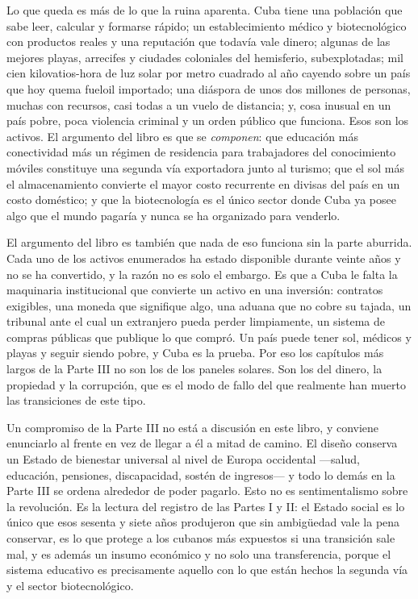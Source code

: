 Lo que queda es más de lo que la ruina aparenta. Cuba tiene una población que
sabe leer, calcular y formarse rápido; un establecimiento médico y
biotecnológico con productos reales y una reputación que todavía vale dinero;
algunas de las mejores playas, arrecifes y ciudades coloniales del hemisferio,
subexplotadas; mil cien kilovatios-hora de luz solar por metro cuadrado al año
cayendo sobre un país que hoy quema fueloil importado; una diáspora de unos dos
millones de personas, muchas con recursos, casi todas a un vuelo de distancia;
y, cosa inusual en un país pobre, poca violencia criminal y un orden público que
funciona. Esos son los activos. El argumento del libro es que se
\emph{componen}: que educación más conectividad más un régimen de residencia
para trabajadores del conocimiento móviles constituye una segunda vía
exportadora junto al turismo; que el sol más el almacenamiento convierte el
mayor costo recurrente en divisas del país en un costo doméstico; y que la
biotecnología es el único sector donde Cuba ya posee algo que el mundo pagaría y
nunca se ha organizado para venderlo.

El argumento del libro es también que nada de eso funciona sin la parte
aburrida. Cada uno de los activos enumerados ha estado disponible durante veinte
años y no se ha convertido, y la razón no es solo el embargo. Es que a Cuba le
falta la maquinaria institucional que convierte un activo en una inversión:
contratos exigibles, una moneda que signifique algo, una aduana que no cobre su
tajada, un tribunal ante el cual un extranjero pueda perder limpiamente, un
sistema de compras públicas que publique lo que compró. Un país puede tener sol,
médicos y playas y seguir siendo pobre, y Cuba es la prueba. Por eso los
capítulos más largos de la Parte III no son los de los paneles solares. Son los
del dinero, la propiedad y la corrupción, que es el modo de fallo del que
realmente han muerto las transiciones de este tipo.

Un compromiso de la Parte III no está a discusión en este libro, y conviene
enunciarlo al frente en vez de llegar a él a mitad de camino. El diseño conserva
un Estado de bienestar universal al nivel de Europa occidental ---salud,
educación, pensiones, discapacidad, sostén de ingresos--- y todo lo demás en la
Parte III se ordena alrededor de poder pagarlo. Esto no es sentimentalismo sobre
la revolución. Es la lectura del registro de las Partes I y II: el Estado social
es lo único que esos sesenta y siete años produjeron que sin ambigüedad vale la
pena conservar, es lo que protege a los cubanos más expuestos si una transición
sale mal, y es además un insumo económico y no solo una transferencia, porque el
sistema educativo es precisamente aquello con lo que están hechos la segunda vía
y el sector biotecnológico.

